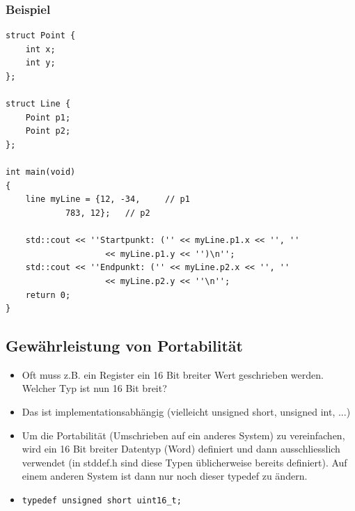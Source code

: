 \subsubsection{Beispiel}
\label{sec:Beispiel}
\noindent
\begin{minipage}{\linewidth}
\begin{lstlisting}
struct Point {
	int x;
	int y;
};

struct Line {
	Point p1;
	Point p2;
};

int main(void)
{
	line myLine = {12, -34,		// p1
			783, 12};	// p2
		
	std::cout << ''Startpunkt: ('' << myLine.p1.x << '', ''
					<< myLine.p1.y << '')\n'';
	std::cout << ''Endpunkt: ('' << myLine.p2.x << '', ''
					<< myLine.p2.y << ''\n'';
	return 0;
}
\end{lstlisting}
\end{minipage}

\subsection{Gewährleistung von Portabilität}
\label{sec:Gewaehrleistung von Portabilitaet}
\begin{itemize}
	\item Oft muss z.B. ein Register ein 16 Bit breiter Wert geschrieben werden. Welcher Typ ist nun 16 Bit breit?
	\item Das ist implementationsabhängig (vielleicht unsigned short, unsigned int, ...)
	\item Um die Portabilität (Umschrieben auf ein anderes System) zu vereinfachen, wird ein 16 Bit breiter Datentyp (Word) definiert und dann ausschliesslich verwendet (in stddef.h sind diese Typen üblicherweise bereits definiert). Auf einem anderen System ist dann nur noch dieser typedef zu ändern.
	\item[\-] 
\noindent
\begin{minipage}{\linewidth}
\begin{lstlisting}
typedef unsigned short uint16_t;
\end{lstlisting}
\end{minipage}
\end{itemize}

